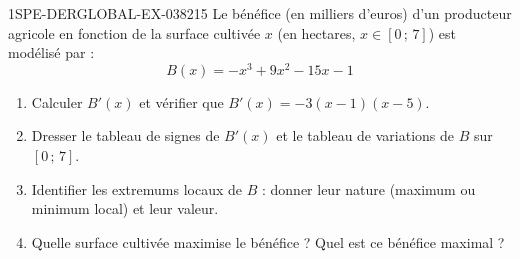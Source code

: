 \begin{exercice}{1SPE-DERGLOBAL-EX-038}{2}{15}
Le bénéfice (en milliers d'euros) d'un producteur agricole en fonction de la surface cultivée $x$ (en hectares, $x \in [0\,;\,7]$) est modélisé par :
\[
B(x) = -x^3 + 9x^2 - 15x - 1
\]

\begin{enumerate}
\item Calculer $B'(x)$ et vérifier que $B'(x) = -3(x-1)(x-5)$.
\item Dresser le tableau de signes de $B'(x)$ et le tableau de variations de $B$ sur $[0\,;\,7]$.
\item Identifier les extremums locaux de $B$ : donner leur nature (maximum ou minimum local) et leur valeur.
\item Quelle surface cultivée maximise le bénéfice ? Quel est ce bénéfice maximal ?
\end{enumerate}
\end{exercice}
